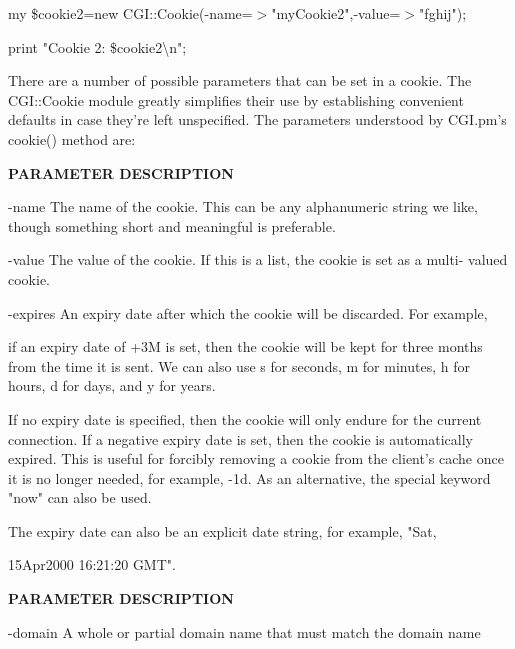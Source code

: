 \documentclass[a4paper,11pt]{book}
\begin{document}
\noindent my \$cookie2=new CGI::Cookie(-name=$>$"myCookie2",-value=$>$"fghij");

\noindent print "Cookie 2: \$cookie2\textbackslash n";

\noindent 

\noindent There are a number of possible parameters that can be set in a cookie. The CGI::Cookie module greatly simplifies their use by establishing convenient defaults in case they're left unspecified. The parameters understood by CGI.pm's cookie() method are:

\noindent 

\noindent 

\noindent \textbf{PARAMETER DESCRIPTION}

\noindent 

\noindent -name The name of the cookie. This can be any alphanumeric string we like, though something short and meaningful is preferable.

\noindent 

\noindent -value The value of the cookie. If this is a list, the cookie is set as a multi- valued cookie.

\noindent 

\noindent -expires An expiry date after which the cookie will be discarded. For example,

\noindent if an expiry date of +3M is set, then the cookie will be kept for three months from the time it is sent. We can also use s for seconds, m for minutes, h for hours, d for days, and y for years.

\noindent 

\noindent If no expiry date is specified, then the cookie will only endure for the current connection. If a negative expiry date is set, then the cookie is automatically expired. This is useful for forcibly removing a cookie from the client's cache once it is no longer needed, for example, -1d. As an alternative, the special keyword "now" can also be used.

\noindent 

\noindent The expiry date can also be an explicit date string, for example, "Sat,

\noindent 15Apr2000 16:21:20 GMT".

\noindent 

\noindent 

\noindent \textbf{PARAMETER DESCRIPTION}

\noindent 

\noindent -domain A whole or partial domain name that must match the domain name
\end{document}
